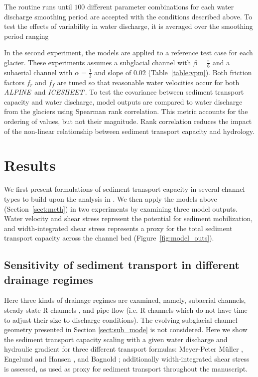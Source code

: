 \documentclass[esurf, manuscript]{copernicus}
\newcommand{\alpine}{\textit{ALPINE}\,}
\newcommand{\icesheet}{\textit{ICESHEET}\,}
\begin{document}
The routine runs until $100$ different parameter combinations for each water discharge smoothing period are accepted with the conditions described above.
To test the effects of variability in water discharge, it is averaged over the smoothing period ranging 

In the second experiment, the models are applied to a reference test case for each glacier.
These experiments assumes  a subglacial channel with $\beta=\frac{\pi}{6}$ and a subaerial channel with $\alpha = \frac{1}{3}$ and slope of $0.02$ (Table~\ref{table:vpm}).
Both friction factors $f_r$ and $f_f$ are tuned so that reasonable water velocities \citep[$\sim\,1.6\,$\unit{m}\,\unit{s}$^{-1}$][]{werder2010b,chandler2013} occur for both \alpine{} and \icesheet{}.
% 
To test the covariance between sediment transport capacity and water discharge, model outputs are compared to water discharge from the glaciers using Spearman rank correlation.
This metric accounts for the ordering of values, but not their magnitude.
Rank correlation reduces the impact of the non-linear relationship between sediment transport capacity and hydrology.

\section{Results}
We first present formulations of sediment transport capacity in several channel types to build upon the analysis in \citet{alley1997}.
We then apply the models above (Section~\ref{sect:meth}) in two experiments by examining three model outputs.
Water velocity and shear stress represent the potential for sediment mobilization, and width-integrated shear stress represents a proxy for the total sediment transport capacity across the channel bed (Figure~\ref{fig:model_outs}).

\subsection{Sensitivity of sediment transport in different drainage regimes}
\label{sect:scaling}

Here three kinds of drainage regimes are examined, namely, subaerial channels, steady-state R-channels \citep{rothlisberger1972}, and pipe-flow (i.e. R-channels which do not have time to adjust their size to discharge conditions).
The evolving subglacial channel geometry presented in Section \ref{sect:sub_mode} is not considered.
Here we show the sediment transport capacity scaling with a given water discharge and hydraulic gradient for three different transport formulas: Meyer-Peter M\"uller  \citep[MPM; ][]{meyer1948}, Engelund and Hansen \citep[EH; ][]{engelund1967}, and Bagnold \citep{bagnold1980}; additionally width-integrated shear stress is assessed, as used as proxy for sediment transport throughout the manuscript.
\end{document}
